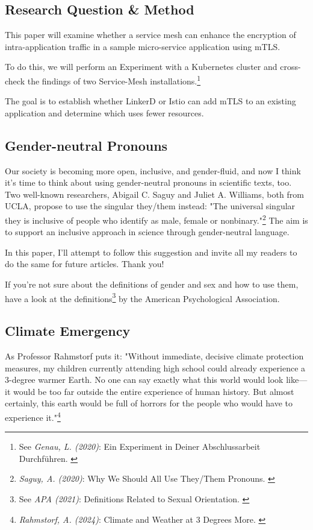 \subsection{Research Question \& Method}

This paper will examine whether a service mesh can enhance the encryption of intra-application traffic in a sample micro-service application using mTLS.

To do this, we will perform an Experiment with a Kubernetes cluster and cross-check the findings of two Service-Mesh installations.\footnote{See \textit{Genau, L. (2020)}: Ein Experiment in Deiner Abschlussarbeit Durchführen. \cite{expScribbr}}

The goal is to establish whether LinkerD or Istio can add mTLS to an existing application and determine which uses fewer resources.

\subsection{Gender-neutral Pronouns}

Our society is becoming more open, inclusive, and gender-fluid, and now I think it's time to think about using gender-neutral pronouns in scientific texts, too. Two well-known researchers, Abigail C. Saguy and Juliet A. Williams, both from UCLA, propose to use the singular they/them instead: "The universal singular they is inclusive of people who identify as male, female or nonbinary."\footnote{\textit{Saguy, A. (2020)}: Why We Should All Use They/Them Pronouns. \cite{pronouns}} The aim is to support an inclusive approach in science through gender-neutral language. 

In this paper, I'll attempt to follow this suggestion and invite all my readers to do the same for future articles. Thank you!

If you're not sure about the definitions of gender and sex and how to use them, have a look at the definitions\footnote{See \textit{APA (2021)}: Definitions Related to Sexual Orientation. \cite{apaDefinitions}} by the American Psychological Association.

\subsection{Climate Emergency}

As Professor Rahmstorf puts it: "Without immediate, decisive climate protection measures, my children currently attending high school could already experience a 3-degree warmer Earth. No one can say exactly what this world would look like—it would be too far outside the entire experience of human history. But almost certainly, this earth would be full of horrors for the people who would have to experience it."\footnote{\textit{Rahmstorf, A. (2024)}: Climate and Weather at 3 Degrees More. \cite{3dgreesMore}}
